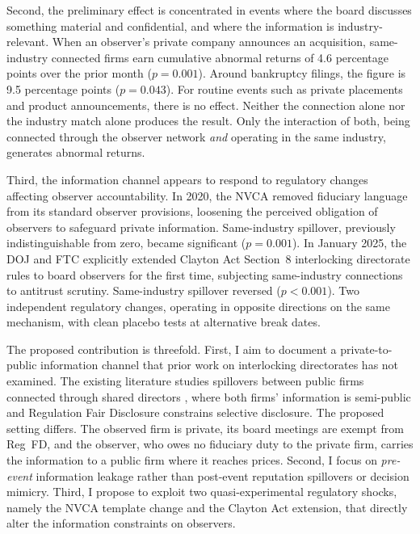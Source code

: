 Second, the preliminary effect is concentrated in events where the board discusses something material and confidential, and where the information is industry-relevant. When an observer's private company announces an acquisition, same-industry connected firms earn cumulative abnormal returns of 4.6 percentage points over the prior month ($p=0.001$). Around bankruptcy filings, the figure is 9.5 percentage points ($p=0.043$). For routine events such as private placements and product announcements, there is no effect. Neither the connection alone nor the industry match alone produces the result. Only the interaction of both, being connected through the observer network \textit{and} operating in the same industry, generates abnormal returns.

Third, the information channel appears to respond to regulatory changes affecting observer accountability. In 2020, the NVCA removed fiduciary language from its standard observer provisions, loosening the perceived obligation of observers to safeguard private information. Same-industry spillover, previously indistinguishable from zero, became significant ($p=0.001$). In January 2025, the DOJ and FTC explicitly extended Clayton Act Section~8 interlocking directorate rules to board observers for the first time, subjecting same-industry connections to antitrust scrutiny. Same-industry spillover reversed ($p<0.001$). Two independent regulatory changes, operating in opposite directions on the same mechanism, with clean placebo tests at alternative break dates.

The proposed contribution is threefold. First, I aim to document a private-to-public information channel that prior work on interlocking directorates has not examined. The existing literature studies spillovers between public firms connected through shared directors \cite{kang2008director,shi2025shared,fracassi2017corporate}, where both firms' information is semi-public and Regulation Fair Disclosure constrains selective disclosure. The proposed setting differs. The observed firm is private, its board meetings are exempt from Reg~FD, and the observer, who owes no fiduciary duty to the private firm, carries the information to a public firm where it reaches prices. Second, I focus on \textit{pre-event} information leakage rather than post-event reputation spillovers or decision mimicry. Third, I propose to exploit two quasi-experimental regulatory shocks, namely the NVCA template change and the Clayton Act extension, that directly alter the information constraints on observers.

